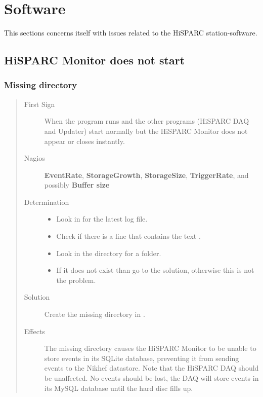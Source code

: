 \documentclass[a4paper,11pt,english]{sphinxmanual}
\begin{document}
\section{Software}
\label{known-issues:software}
This sections concerns itself with issues related to the HiSPARC
station-software.


\subsection{HiSPARC Monitor does not start}
\label{known-issues:hisparc-monitor-does-not-start}

\subsubsection{Missing directory}
\label{known-issues:missing-directory}\begin{quote}\begin{description}
\item[{First Sign}] \leavevmode
When the  program runs and the other programs (HiSPARC DAQ and Updater) start normally but the HiSPARC Monitor does not appear or closes instantly.

\item[{Nagios}] \leavevmode
\textbf{EventRate}, \textbf{StorageGrowth}, \textbf{StorageSize}, \textbf{TriggerRate}, and possibly \textbf{Buffer size}

\item[{Determination}] \leavevmode\begin{itemize}
\item {} 
Look in  for the latest log file.

\item {} 
Check if there is a line that contains the text .

\item {} 
Look in the  directory for a  folder.

\item {} 
If it does not exist than go to the solution, otherwise this is not the problem.

\end{itemize}

\item[{Solution}] \leavevmode
Create the missing  directory in .

\item[{Effects}] \leavevmode
The missing directory causes the HiSPARC Monitor to be unable to store events in its SQLite database, preventing it from sending events to the Nikhef datastore. Note that the HiSPARC DAQ should be unaffected. No events should be lost, the DAQ will store events in its MySQL database until the hard disc fills up.

\end{description}\end{quote}
\end{document}
